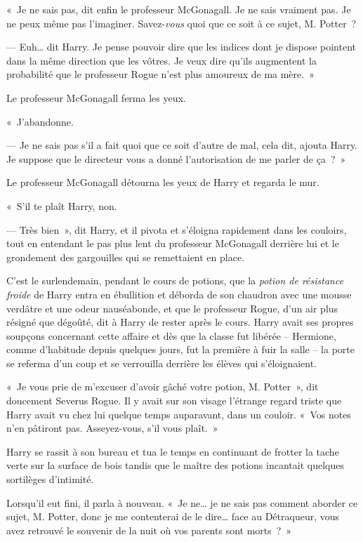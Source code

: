 \later

«~Je ne sais pas, dit enfin le professeur McGonagall. Je ne sais vraiment pas. Je ne peux même pas l'imaginer. Savez-\emph{vous} quoi que ce soit à ce sujet, M. Potter~?

--- Euh… dit Harry. Je pense pouvoir dire que les indices dont je dispose pointent dans la même direction que les vôtres. Je veux dire qu'ils augmentent la probabilité que le professeur Rogue n'est plus amoureux de ma mère.~»

Le professeur McGonagall ferma les yeux.

«~J'abandonne.

--- Je ne sais pas s'il a fait quoi que ce soit d'autre de mal, cela dit, ajouta Harry. Je suppose que le directeur vous a donné l'autorisation de me parler de ça~?~»

Le professeur McGonagall détourna les yeux de Harry et regarda le mur.

«~S'il te plaît Harry, non.

--- Très bien~», dit Harry, et il pivota et s'éloigna rapidement dans les couloirs, tout en entendant le pas plus lent du professeur McGonagall derrière lui et le grondement des gargouilles qui se remettaient en place.

\later

C'est le surlendemain, pendant le cours de potions, que la \emph{potion de résistance froide} de Harry entra en ébullition et déborda de son chaudron avec une mousse verdâtre et une odeur nauséabonde, et que le professeur Rogue, d'un air plus résigné que dégoûté, dit à Harry de rester après le cours. Harry avait ses propres soupçons concernant cette affaire et dès que la classe fut libérée -- Hermione, comme d'habitude depuis quelques jours, fut la première à fuir la salle -- la porte se referma d'un coup et se verrouilla derrière les élèves qui s'éloignaient.

«~Je vous prie de m'excuser d'avoir gâché votre potion, M. Potter~», dit doucement Severus Rogue. Il y avait sur son visage l'étrange regard triste que Harry avait vu chez lui quelque temps auparavant, dans un couloir. «~Vos notes n'en pâtiront pas. Asseyez-vous, s'il vous plaît.~»

Harry se rassit à son bureau et tua le temps en continuant de frotter la tache verte sur la surface de bois tandis que le maître des potions incantait quelques sortilèges d'intimité.

Lorsqu'il eut fini, il parla à nouveau. «~Je ne… je ne sais pas comment aborder ce sujet, M. Potter, donc je me contenterai de le dire… face au Détraqueur, vous avez retrouvé le souvenir de la nuit où vos parents sont morts~?~»

